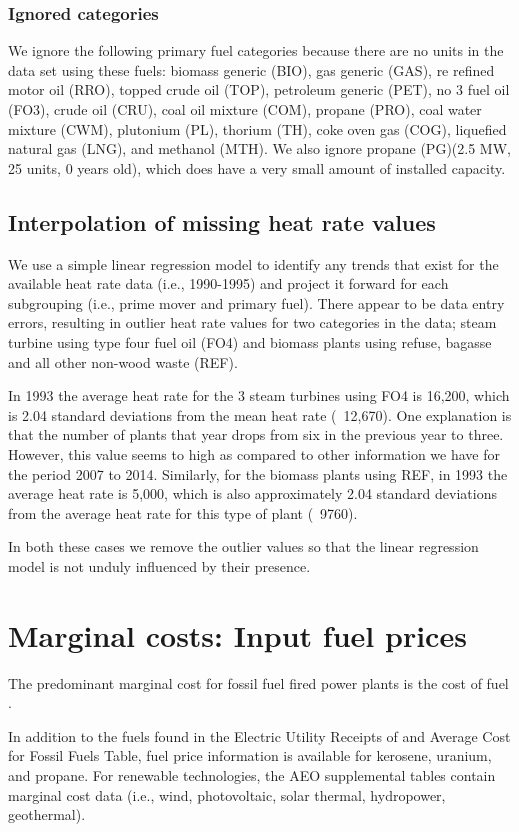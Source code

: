 \documentclass[10pt]{report}
\begin{document}
\subsection{Ignored categories}
We ignore the following primary fuel categories because there are no units in the data set using these fuels: biomass generic (BIO), gas generic (GAS), re refined motor oil (RRO), topped crude oil (TOP), petroleum generic (PET), no 3 fuel oil (FO3), crude oil (CRU), coal oil mixture (COM), propane (PRO), coal water mixture (CWM), plutonium (PL), thorium (TH), coke oven gas (COG), liquefied natural gas (LNG), and methanol (MTH). We also ignore propane (PG)(2.5 MW, 25 units, 0 years old), which does have a very small amount of installed capacity. 

\section{Interpolation of missing heat rate values}
We use a simple linear regression model to identify any trends that exist for the available heat rate data (i.e., 1990-1995) and project it forward for each subgrouping (i.e., prime mover and primary fuel). 
There appear to be data entry errors, resulting in outlier heat rate values for two categories in the data; steam turbine using type four fuel oil (FO4) and biomass plants using refuse, bagasse and all other non-wood waste (REF). 

In 1993 the average heat rate for the 3 steam turbines using FO4 is 16,200, which is 2.04 standard deviations from the mean heat rate (~12,670). One explanation is that the number of plants that year drops from six in the previous year to three. However, this value seems to high as compared to other information we have for the period 2007 to 2014. Similarly, for the biomass plants using REF, in 1993 the average heat rate is 5,000, which is also approximately 2.04 standard deviations from the average heat rate for this type of plant (~9760). 

In both these cases we remove the outlier values so that the linear regression model is not unduly influenced by their presence. 

\chapter{Marginal costs: Input fuel prices}
The predominant marginal cost for fossil fuel fired power plants is the cost of fuel \parencite{}. 

In addition to the fuels found in the Electric Utility Receipts of and Average Cost for Fossil Fuels Table, fuel price information is available for kerosene, uranium, and propane.
For renewable technologies, the AEO supplemental tables contain marginal cost data (i.e., wind, photovoltaic, solar thermal, hydropower, geothermal).
\end{document}
